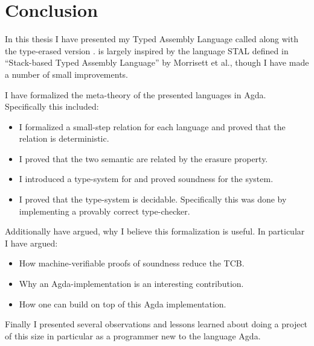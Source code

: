 \chapter{Conclusion}
\label{chap:conclusion}

In this thesis I have presented my Typed Assembly Language called \ATAL along
with the type-erased version \ATALe. \ATAL is largely inspired by the language
STAL defined in ``Stack-based Typed Assembly Language''\cite{STAL} by Morrisett
et al., though I have made a number of small improvements.

I have formalized the meta-theory of the presented languages in
Agda. Specifically this included:

\begin{itemize}
\item I formalized a small-step relation for each language and proved that the
  relation is deterministic.
\item I proved that the two semantic are related by the erasure property.
\item I introduced a type-system for \ATAL and proved soundness for the system.
\item I proved that the type-system is decidable. Specifically this was done by
  implementing a provably correct type-checker.
\end{itemize}

Additionally have argued, why I believe this formalization is useful. In
particular I have argued:

\begin{itemize}
\item How machine-verifiable proofs of soundness reduce the TCB.
\item Why an Agda-implementation is an interesting contribution.
\item How one can build on top of this Agda implementation.
\end{itemize}

Finally I presented several observations and lessons learned about doing a
project of this size in particular as a programmer new to the language Agda.

